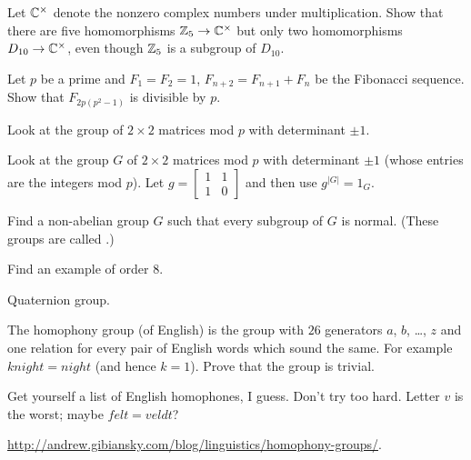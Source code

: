 \begin{problem}
	Let $\mathbb C^\times$ denote the nonzero complex numbers under multiplication.
	Show that there are five homomorphisms $\mathbb Z_{5} \to \mathbb C^\times$
	but only two homomorphisms $D_{10} \to \mathbb C^\times$,
	even though $\mathbb Z_{5}$ is a subgroup of $D_{10}$.
\end{problem}

\begin{problem}
	\gim
	Let $p$ be a prime and $F_1 = F_2 = 1$, $F_{n+2} = F_{n+1} + F_n$
	be the Fibonacci sequence.
	Show that $F_{2p(p^2-1)}$ is divisible by $p$.
	\begin{hint}
		Look at the group of $2 \times 2$ matrices mod $p$
		with determinant $\pm 1$.
	\end{hint}
	\begin{sol}
		Look at the group $G$ of $2 \times 2$ matrices mod $p$
		with determinant $\pm 1$ (whose entries are the integers mod $p$).
		Let $g = \begin{bmatrix} 1 & 1 \\ 1 & 0 \end{bmatrix}$
		and then use $g^{\left\lvert G \right\rvert} = 1_G$.
	\end{sol}
\end{problem}

\begin{problem}
	\gim
	Find a non-abelian group $G$
	such that every subgroup of $G$ is normal.
	(These groups are called .)
	\begin{hint}
		Find an example of order $8$.
	\end{hint}
	\begin{sol}
		Quaternion group.
	\end{sol}
\end{problem}

\begin{problem}
	\yod
    The homophony group (of English) is the group with $26$ generators $a$, $b$, \dots, $z$
	and one relation for every pair of English words which sound the same.
	For example $knight = night$ (and hence $k=1$).
	Prove that the group is trivial.
	\begin{hint}
		Get yourself a list of English homophones, I guess.
		Don't try too hard.
		Letter $v$ is the worst; maybe $felt = veldt$?
	\end{hint}
	\begin{sol}
		\url{http://andrew.gibiansky.com/blog/linguistics/homophony-groups/}.
	\end{sol}
\end{problem}

